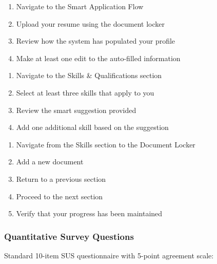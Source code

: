 \documentclass[
	letterpaper, %
]{jdf}
\begin{document}
\begin{sloppypar}
\begin{enumerate}
    \item Navigate to the Smart Application Flow
    \item Upload your resume using the document locker
    \item Review how the system has populated your profile
    \item Make at least one edit to the auto-filled information
\end{enumerate}

\begin{enumerate}
    \item Navigate to the Skills \& Qualifications section
    \item Select at least three skills that apply to you
    \item Review the smart suggestion provided
    \item Add one additional skill based on the suggestion
\end{enumerate}

\begin{enumerate}
    \item Navigate from the Skills section to the Document Locker
    \item Add a new document
    \item Return to a previous section
    \item Proceed to the next section
    \item Verify that your progress has been maintained
\end{enumerate}

\subsubsection*{Quantitative Survey Questions}

Standard 10-item SUS questionnaire with 5-point agreement scale:


\end{sloppypar}
\end{document}
